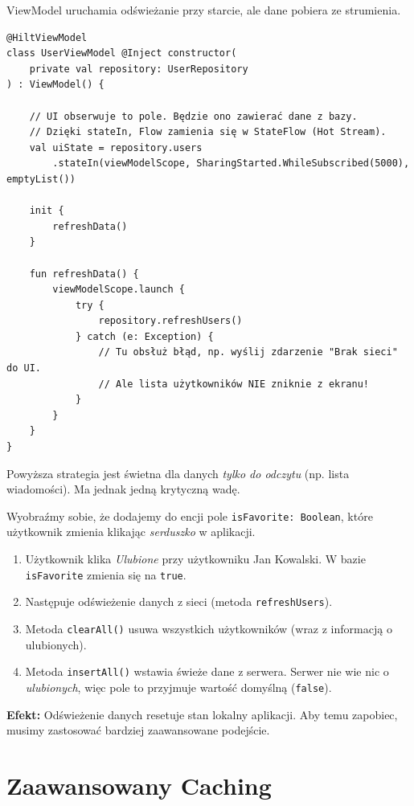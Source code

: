 ViewModel uruchamia odświeżanie przy starcie, ale dane pobiera ze strumienia.

\begin{verbatim}
@HiltViewModel
class UserViewModel @Inject constructor(
    private val repository: UserRepository
) : ViewModel() {

    // UI obserwuje to pole. Będzie ono zawierać dane z bazy.
    // Dzięki stateIn, Flow zamienia się w StateFlow (Hot Stream).
    val uiState = repository.users
        .stateIn(viewModelScope, SharingStarted.WhileSubscribed(5000), emptyList())

    init {
        refreshData()
    }

    fun refreshData() {
        viewModelScope.launch {
            try {
                repository.refreshUsers()
            } catch (e: Exception) {
                // Tu obsłuż błąd, np. wyślij zdarzenie "Brak sieci" do UI.
                // Ale lista użytkowników NIE zniknie z ekranu!
            }
        }
    }
}
\end{verbatim}

Powyższa strategia jest świetna dla danych \textit{tylko do odczytu} (np. lista wiadomości). Ma jednak jedną krytyczną wadę.

Wyobraźmy sobie, że dodajemy do encji pole \texttt{isFavorite: Boolean}, które użytkownik zmienia klikając \textit{serduszko} w aplikacji.
\begin{enumerate}
    \item Użytkownik klika \textit{Ulubione} przy użytkowniku Jan Kowalski. W bazie \texttt{isFavorite} zmienia się na \texttt{true}.
    \item Następuje odświeżenie danych z sieci (metoda \texttt{refreshUsers}).
    \item Metoda \texttt{clearAll()} usuwa wszystkich użytkowników (wraz z informacją o ulubionych).
    \item Metoda \texttt{insertAll()} wstawia świeże dane z serwera. Serwer nie wie nic o \textit{ulubionych}, więc pole to przyjmuje wartość domyślną (\texttt{false}).
\end{enumerate}

\textbf{Efekt:} Odświeżenie danych resetuje stan lokalny aplikacji. Aby temu zapobiec, musimy zastosować bardziej zaawansowane podejście.

\section{Zaawansowany Caching}

